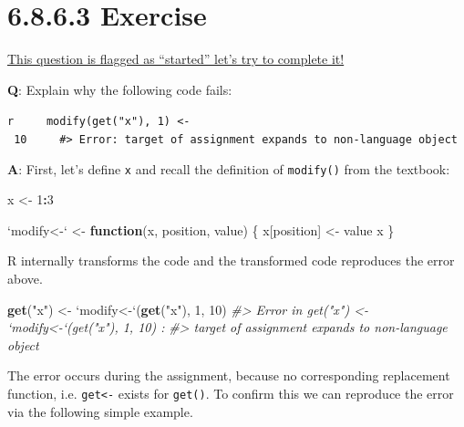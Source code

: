 \documentclass[]{book}
\newenvironment{Shaded}{\begin{snugshade}}{\end{snugshade}}
\newcommand{\CommentTok}[1]{\textcolor[rgb]{0.56,0.35,0.01}{\textit{#1}}}
\newcommand{\ControlFlowTok}[1]{\textcolor[rgb]{0.13,0.29,0.53}{\textbf{#1}}}
\newcommand{\DataTypeTok}[1]{\textcolor[rgb]{0.13,0.29,0.53}{#1}}
\newcommand{\DecValTok}[1]{\textcolor[rgb]{0.00,0.00,0.81}{#1}}
\newcommand{\KeywordTok}[1]{\textcolor[rgb]{0.13,0.29,0.53}{\textbf{#1}}}
\newcommand{\NormalTok}[1]{#1}
\newcommand{\OperatorTok}[1]{\textcolor[rgb]{0.81,0.36,0.00}{\textbf{#1}}}
\newcommand{\StringTok}[1]{\textcolor[rgb]{0.31,0.60,0.02}{#1}}
\begin{document}
\hypertarget{exercise-7}{%
\section*{6.8.6.3 Exercise}\label{exercise-7}}

\href{https://github.com/Tazinho/Advanced-R-Solutions/blob/5043d9b06c7469a010c568ecb85e12bedca75207/2-06-Functions.Rmd\#L433}{This question is flagged as ``started'' let's try to complete it!}

\textbf{{Q}}: Explain why the following code fails:

\texttt{r\ \ \ \ \ modify(get("x"),\ 1)\ \textless{}-\ 10\ \ \ \ \ \#\textgreater{}\ Error:\ target\ of\ assignment\ expands\ to\ non-language\ object}

\textbf{{A}}: First, let's define \texttt{x} and recall the definition of \texttt{modify()} from the textbook:

\begin{Shaded}
\begin{Highlighting}[]
\NormalTok{    x <-}\StringTok{ }\DecValTok{1}\OperatorTok{:}\DecValTok{3}
    
    \StringTok{`}\DataTypeTok{modify<-}\StringTok{`}\NormalTok{ <-}\StringTok{ }\ControlFlowTok{function}\NormalTok{(x, position, value) \{}
\NormalTok{      x[position] <-}\StringTok{ }\NormalTok{value}
\NormalTok{      x}
\NormalTok{    \}}
\end{Highlighting}
\end{Shaded}

R internally transforms the code and the transformed code reproduces the error above.

\begin{Shaded}
\begin{Highlighting}[]
\KeywordTok{get}\NormalTok{(}\StringTok{"x"}\NormalTok{) <-}\StringTok{ `}\DataTypeTok{modify<-}\StringTok{`}\NormalTok{(}\KeywordTok{get}\NormalTok{(}\StringTok{"x"}\NormalTok{), }\DecValTok{1}\NormalTok{, }\DecValTok{10}\NormalTok{)}
\CommentTok{#> Error in get("x") <- `modify<-`(get("x"), 1, 10) : }
\CommentTok{#> target of assignment expands to non-language object}
\end{Highlighting}
\end{Shaded}

The error occurs during the assignment, because no corresponding replacement function, i.e. \texttt{get\textless{}-} exists for \texttt{get()}. To confirm this we can reproduce the error via the following simple example.
\end{document}

